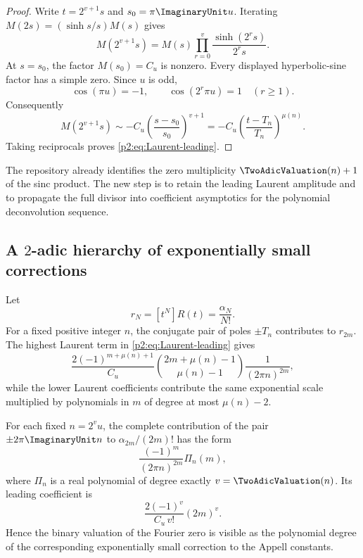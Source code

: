 \documentclass[11pt,oneside]{article}
\numberwithin{equation}{section}
\theoremstyle{definition}
\theoremstyle{remark}
\begin{document}
\begin{proof}
Write $t=2^{v+1}s$ and $s_0=\pi\ImaginaryUnit u$.  Iterating
$M(2s)=(\sinh s/s)M(s)$ gives
\begin{equation}
 M(2^{v+1}s)=M(s)\prod_{r=0}^{v}\frac{\sinh(2^rs)}{2^rs}.
 \label{p2:eq:M-iterate-pole}
\end{equation}
At $s=s_0$, the factor $M(s_0)=C_u$ is nonzero.  Every displayed hyperbolic-sine factor has a
simple zero.  Since $u$ is odd,
\begin{equation*}
 \cos(\pi u)=-1,
 \qquad
 \cos(2^r\pi u)=1\quad(r\ge1).
\end{equation*}
Consequently
\[
 M(2^{v+1}s)
 \sim -C_u\left(\frac{s-s_0}{s_0}\right)^{v+1}
 =-C_u\left(\frac{t-T_n}{T_n}\right)^{\mu(n)}.
\]
Taking reciprocals proves \eqref{p2:eq:Laurent-leading}.
\end{proof}

\begin{remark}
The repository already identifies the zero multiplicity $\TwoAdicValuation(n)+1$ of the sinc product.  The new
step is to retain the leading Laurent amplitude and to propagate the full divisor into coefficient
asymptotics for the polynomial deconvolution sequence.
\end{remark}

\subsection{A \texorpdfstring{$2$}{2}-adic hierarchy of exponentially small corrections}

Let
\begin{equation}
 r_N=[t^N]R(t)=\frac{\alpha_N}{N!}.
 \label{p2:eq:rN}
\end{equation}
For a fixed positive integer $n$, the conjugate pair of poles $\pm T_n$ contributes to $r_{2m}$.
The highest Laurent term in \eqref{p2:eq:Laurent-leading} gives
\begin{equation}
 \frac{2(-1)^{m+\mu(n)+1}}{C_u}
 \binom{2m+\mu(n)-1}{\mu(n)-1}
 \frac1{(2\pi n)^{2m}},
 \label{p2:eq:general-shell-leading}
\end{equation}
while the lower Laurent coefficients contribute the same exponential scale multiplied by
polynomials in $m$ of degree at most $\mu(n)-2$.

\begin{corollary}
\label{p2:cor:pole-degree}
For each fixed $n=2^vu$, the complete contribution of the pair $\pm2\pi\ImaginaryUnit n$ to
$\alpha_{2m}/(2m)!$ has the form
\begin{equation}
 \frac{(-1)^m}{(2\pi n)^{2m}}\Pi_n(m),
 \label{p2:eq:Pi-shell}
\end{equation}
where $\Pi_n$ is a real polynomial of degree exactly $v=\TwoAdicValuation(n)$.  Its leading coefficient is
\begin{equation}
 \frac{2(-1)^{v}}{C_u\,v!}(2m)^v.
 \label{p2:eq:Pi-leading}
\end{equation}
Hence the binary valuation of the Fourier zero is visible as the polynomial degree of the
corresponding exponentially small correction to the Appell constants.
\end{corollary}
\end{document}
